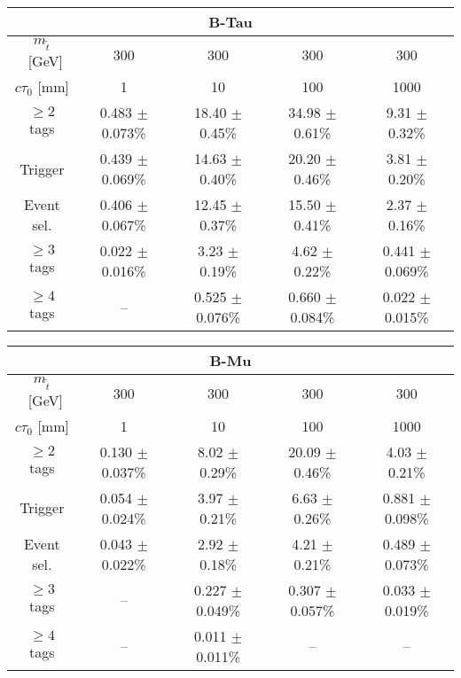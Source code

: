 \begin{table}[tb]
\begin{center}
\begin{tabular}{ccccc} 
\multicolumn{5}{c}{\textbf{B-Tau}} \\
 \hline 
$m_{\tilde{t}}$~[GeV] & 300 & 300 & 300 & 300 \\ 
 $c\tau_0$ [mm] & 1 & 10 & 100 & 1000 \\ 
\hline 
$\geq 2$ tags &  0.483 $\pm$ 0.073\% &   18.40 $\pm$ 0.45\% &    34.98 $\pm$ 0.61\% &    9.31 $\pm$ 0.32\% \\ 
Trigger &     0.439 $\pm$ 0.069\% &  14.63 $\pm$ 0.40\% &   20.20 $\pm$ 0.46\% &    3.81 $\pm$ 0.20\% \\ 
Event sel. &   0.406 $\pm$ 0.067\% &  12.45 $\pm$ 0.37\% &   15.50 $\pm$ 0.41\% &   2.37 $\pm$ 0.16\% \\ 
$\geq 3$ tags &     0.022 $\pm$ 0.016\% &  3.23 $\pm$ 0.19\% &    4.62 $\pm$ 0.22\% &    0.441 $\pm$ 0.069\% \\ 
$\geq 4$ tags &     -- &  0.525 $\pm$ 0.076\% &       0.660 $\pm$ 0.084\% &  0.022 $\pm$ 0.015\% \\ 
\end{tabular}

\begin{tabular}{ccccc} 
\multicolumn{5}{c}{\textbf{B-Mu}} \\
 \hline 
 $m_{\tilde{t}}$~[GeV] & 300 & 300 & 300 & 300 \\ 
 $c\tau_0$ [mm] & 1 & 10 & 100 & 1000 \\ 
 \hline 
  $\geq 2$ tags &        0.130 $\pm$ 0.037\% &   8.02 $\pm$ 0.29\% &     20.09 $\pm$ 0.46\% &    4.03 $\pm$ 0.21\% \\ 
   Trigger &     0.054 $\pm$ 0.024\% &        3.97 $\pm$ 0.21\% &   6.63 $\pm$ 0.26\% &      0.881 $\pm$ 0.098\% \\ 
    Event sel. &   0.043 $\pm$ 0.022\% &  2.92 $\pm$ 0.18\% &   4.21 $\pm$ 0.21\% &      0.489 $\pm$ 0.073\% \\ 
     $\geq 3$ tags &     -- &  0.227 $\pm$ 0.049\% &       0.307 $\pm$ 0.057\% &        0.033 $\pm$ 0.019\% \\ 
      $\geq 4$ tags &     -- &  0.011 $\pm$ 0.011\% &       -- &  -- \\ 
\end{tabular}
\end{center}
\end{table}

